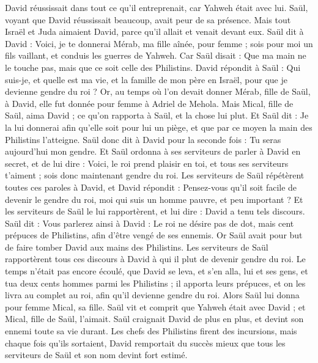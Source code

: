 \begin{multicols}{2}
David réussissait dans tout ce qu'il entreprenait, car Yahweh était avec lui.
Saül, voyant que David réussissait beaucoup, avait peur de sa présence.
Mais tout Israël et Juda aimaient David, parce qu'il allait et venait devant eux.
Saül dit à David : Voici, je te donnerai Mérab, ma fille aînée, pour femme ; sois pour moi un fils vaillant, et conduis les guerres de Yahweh. Car Saül disait : Que ma main ne le touche pas, mais que ce soit celle des Philistins.
David répondit à Saül : Qui suis-je, et quelle est ma vie, et la famille de mon père en Israël, pour que je devienne gendre du roi ?
Or, au temps où l'on devait donner Mérab, fille de Saül, à David, elle fut donnée pour femme à Adriel de Mehola.
Mais Mical, fille de Saül, aima David ; ce qu'on rapporta à Saül, et la chose lui plut.
Et Saül dit : Je la lui donnerai afin qu'elle soit pour lui un piège, et que par ce moyen la main des Philistins l'atteigne. Saül donc dit à David pour la seconde fois : Tu seras aujourd'hui mon gendre.
Et Saül ordonna à ses serviteurs de parler à David en secret, et de lui dire : Voici, le roi prend plaisir en toi, et tous ses serviteurs t'aiment ; sois donc maintenant gendre du roi.
Les serviteurs de Saül répétèrent toutes ces paroles à David, et David répondit : Pensez-vous qu'il soit facile de devenir le gendre du roi, moi qui suis un homme pauvre, et peu important ?
Et les serviteurs de Saül le lui rapportèrent, et lui dire : David a tenu tels discours.
Saül dit : Vous parlerez ainsi à David : Le roi ne désire pas de dot, mais cent prépuces de Philistins, afin d'être vengé de ses ennemis. Or Saül avait pour but de faire tomber David aux mains des Philistins.
Les serviteurs de Saül rapportèrent tous ces discours à David à qui il plut de devenir gendre du roi. Le temps n'était pas encore écoulé,
que David se leva, et s'en alla, lui et ses gens, et tua deux cents hommes parmi les Philistins ; il apporta leurs prépuces, et on les livra au complet au roi, afin qu'il devienne gendre du roi. Alors Saül lui donna pour femme Mical, sa fille.
Saül vit et comprit que Yahweh était avec David ; et Mical, fille de Saül, l'aimait.
Saül craignait David de plus en plus, et devint son ennemi toute sa vie durant.
Les chefs des Philistins firent des incursions, mais chaque fois qu'ils sortaient, David remportait du succès mieux que tous les serviteurs de Saül et son nom devint fort estimé.

\end{multicols}
